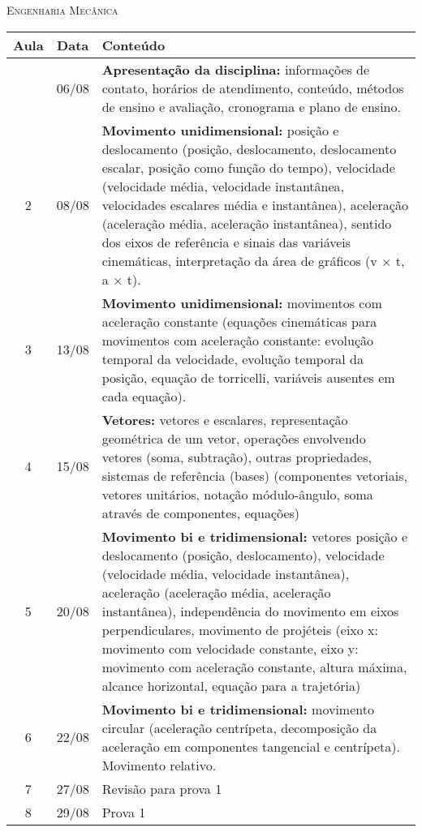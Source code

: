 \vspace{1cm}
\begin{center}
\Large\textsc{Engenharia Mecânica}
\end{center}
\begin{center}
\begin{longtable}{ccp{70mm}}
\toprule
Aula & Data & Conteúdo \\
\midrule
\endhead
\bottomrule
\endfoot
  1 & 06/08 & \textbf{Apresentação da disciplina:} informações de contato, horários de atendimento, conteúdo, métodos de ensino e avaliação, cronograma e plano de ensino.\\
  2 & 08/08 & \textbf{Movimento unidimensional:} posição e deslocamento (posição, deslocamento, deslocamento escalar, posição como função do tempo), velocidade (velocidade média, velocidade instantânea, velocidades escalares média e instantânea), aceleração (aceleração média, aceleração instantânea), sentido dos eixos de referência e sinais das variáveis cinemáticas, interpretação da área de gráficos (v × t, a × t).\\
  3 & 13/08 & \textbf{Movimento unidimensional:} movimentos com aceleração constante (equações cinemáticas para movimentos com aceleração constante: evolução temporal da velocidade, evolução temporal da posição, equação de torricelli, variáveis ausentes em cada equação).\\
  4 & 15/08 & \textbf{Vetores:} vetores e escalares, representação geométrica de um vetor, operações envolvendo vetores (soma, subtração), outras propriedades, sistemas de referência (bases) (componentes vetoriais, vetores unitários, notação módulo-ângulo, soma através de componentes, equações)\\
  5 & 20/08 & \textbf{Movimento bi e tridimensional:} vetores posição e deslocamento (posição, deslocamento), velocidade (velocidade média, velocidade instantânea), aceleração (aceleração média, aceleração instantânea), independência do movimento em eixos perpendiculares, movimento de projéteis (eixo x: movimento com velocidade constante, eixo y: movimento com aceleração constante, altura máxima, alcance horizontal, equação para a trajetória)\\
  6 & 22/08 & \textbf{Movimento bi e tridimensional:} movimento circular (aceleração centrípeta, decomposição da aceleração em componentes tangencial e centrípeta). Movimento relativo.\\
  7 & 27/08 & Revisão para prova 1\\
  8 & 29/08 & Prova 1\\

\end{longtable}
\end{center}
